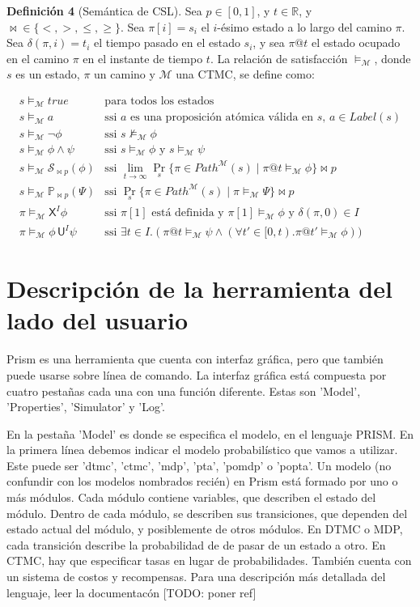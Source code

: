 \documentclass[runningheads]{llncs}
\begin{document}
\textbf{Definición 4} (Semántica de CSL). Sea $p \in [0,1]$, y $t \in \mathbb{R}$, y $\bowtie \in \{<, >, \leq, \geq\}$. Sea $\pi[i] = s_i$ el $i$-ésimo estado a lo largo del camino $\pi$. Sea $\delta(\pi, i) = t_i$ el tiempo pasado en el estado $s_i$, y sea $\pi@t$ el estado ocupado en el camino $\pi$ en el instante de tiempo $t$.
La relación de satisfacción $\models_\mathcal{M}$, donde $s$ es un estado, $\pi$ un camino y $\mathcal{M}$ una CTMC, se define como:

\[
\begin{array}{ll}
s \models_\mathcal{M} \mathit{true} & \text{para todos los estados} \\
s \models_\mathcal{M} a & \text{ssi $a$ es una proposición atómica válida en $s$, $a \in Label(s)$} \\
s \models_\mathcal{M} \neg \phi & \text{ssi } s \not\models_\mathcal{M} \phi \\
s \models_\mathcal{M} \phi \land \psi & \text{ssi } s \models_\mathcal{M} \phi \text{ y } s \models_\mathcal{M} \psi \\
s \models_\mathcal{M} \mathcal{S}_{\bowtie p}(\phi) & \text{ssi } \lim_{t \to \infty} \Pr_s\{\pi \in Path^\mathcal{M}(s) \mid \pi@t \models_\mathcal{M} \phi \} \bowtie p \\
s \models_\mathcal{M} \mathbb{P}_{\bowtie p}(\Psi) & \text{ssi } \Pr_s\{\pi \in Path^\mathcal{M}(s) \mid \pi \models_\mathcal{M} \Psi\} \bowtie p \\
\pi \models_\mathcal{M} \mathsf{X}^I \phi & \text{ssi } \pi[1] \text{ está definida y } \pi[1] \models_\mathcal{M} \phi \text{ y } \delta(\pi, 0) \in I \\
\pi \models_\mathcal{M} \phi \, \mathsf{U}^I \psi & \text{ssi } \exists t \in I. (\pi@t \models_\mathcal{M} \psi \land (\forall t' \in [0,t). \pi@t' \models_\mathcal{M} \phi))
\end{array}
\]


\section{Descripción de la herramienta del lado del usuario}

Prism es una herramienta que cuenta con interfaz gráfica, pero que también puede usarse sobre línea de comando. La interfaz gráfica está compuesta por cuatro pestañas cada una con una función diferente. Estas son 'Model', 'Properties', 'Simulator' y 'Log'.

En la pestaña 'Model' es donde se especifica el modelo, en el lenguaje PRISM. En la primera línea debemos indicar el modelo probabilístico que vamos a utilizar. Este puede ser 'dtmc', 'ctmc', 'mdp', 'pta', 'pomdp' o 'popta'. Un modelo (no confundir con los modelos nombrados recién) en Prism está formado por uno o más módulos. Cada módulo contiene variables, que describen el estado del módulo. Dentro de cada módulo, se describen sus transiciones, que dependen del estado actual del módulo, y posiblemente de otros módulos. En DTMC o MDP, cada transición describe la probabilidad de de pasar de un estado a otro. En CTMC, hay que especificar tasas en lugar de probabilidades. También cuenta con un sistema de costos y recompensas.
Para una descripción más detallada del lenguaje, leer la documentacón [TODO: poner ref]
\end{document}
